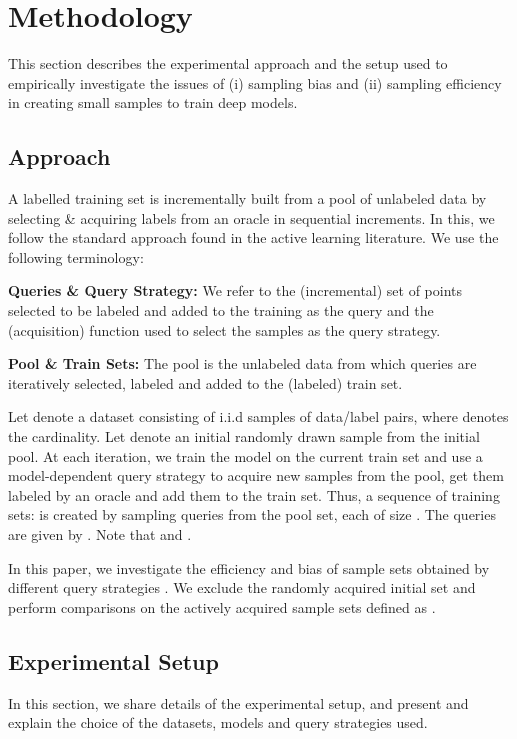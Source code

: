 \documentclass[11pt,a4paper]{article}
\begin{document}
\section{Methodology}\label{sec:method}
This section describes the experimental approach and the setup used to empirically investigate the issues of (i) sampling bias and (ii) sampling efficiency in creating small samples to train deep models.

\subsection{Approach}
A labelled training set is incrementally built from a pool of unlabeled data by selecting \& acquiring labels from an oracle in sequential increments. In this, we follow  the standard approach found in the active learning literature. We use the following terminology:

\textbf{Queries \& Query Strategy:} We refer to the (incremental) set of points selected to be labeled and added to the training as the query and the (acquisition) function used to select the samples as the query strategy. 

\textbf{Pool \& Train Sets:} The pool is the unlabeled data from which queries are iteratively selected, labeled and added to the (labeled) train set. 

Let  denote a dataset consisting of  i.i.d samples of data/label pairs, where  denotes the cardinality. Let  denote an initial randomly drawn sample from the initial pool. At each iteration, we train the model on the current train set and use a model-dependent query strategy to acquire new samples from the pool, get them labeled by an oracle and add them to the train set. Thus, a sequence of training sets:  is created by sampling  queries from the pool set, each of size . The  queries are given by . Note that  and . 

In this paper, we investigate the efficiency and bias of sample sets  obtained by different query strategies . We exclude the randomly acquired initial set and perform comparisons on the actively acquired sample sets defined as .



\subsection{Experimental Setup}

In this section, we share details of the experimental setup, and present and explain the choice of the datasets, models and query strategies used. 
\end{document}
